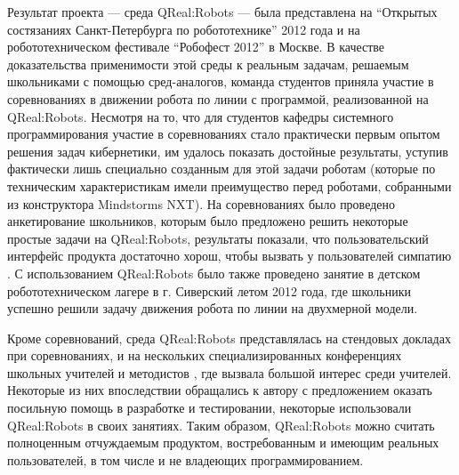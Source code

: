 Результат проекта --- среда QReal:Robots --- была представлена на "`Открытых состязаниях 
Санкт-Петербурга по робототехнике"' 2012 года и на робототехническом фестивале "`Робофест 2012"' 
в Москве. В качестве доказательства применимости этой среды к реальным задачам, решаемым 
школьниками с помощью сред-аналогов, команда студентов приняла участие в соревнованиях 
в движении робота по линии с программой, реализованной на QReal:Robots. Несмотря на 
то, что для студентов кафедры системного программирования участие в соревнованиях 
стало практически первым опытом решения задач кибернетики, им удалось показать достойные 
результаты, уступив фактически лишь специально созданным для этой задачи роботам (которые 
по техническим характеристикам имели преимущество перед роботами, собранными из конструктора 
Mindstorms NXT). На соревнованиях было проведено анкетирование школьников, которым 
было предложено решить некоторые простые задачи на QReal:Robots, результаты показали, 
что пользовательский интерфейс продукта достаточно хорош, чтобы вызвать у пользователей 
симпатию%
. С использованием QReal:Robots было также проведено занятие в детском робототехническом 
лагере в г. Сиверский летом 2012 года, где школьники успешно решили задачу движения 
робота по линии на двухмерной модели.

Кроме соревнований, среда QReal:Robots представлялась на стендовых докладах при соревнованиях, 
и на нескольких специализированных конференциях школьных учителей и методистов%
, где вызвала большой интерес среди учителей. Некоторые из них впоследствии обращались 
к автору с предложением оказать посильную помощь в разработке и тестировании, некоторые 
использовали QReal:Robots в своих занятиях. Таким образом, QReal:Robots можно считать 
полноценным отчуждаемым продуктом, востребованным и имеющим реальных пользователей, 
в том числе и не владеющих программированием.
